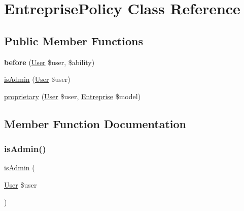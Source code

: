 \hypertarget{class_app_1_1_policies_1_1_entreprise_policy}{}\section{Entreprise\+Policy Class Reference}
\label{class_app_1_1_policies_1_1_entreprise_policy}
\subsection*{Public Member Functions}
\begin{DoxyCompactItemize}
\item 
\mbox{\label{class_app_1_1_policies_1_1_entreprise_policy_ae8e148ffcb5929131f9bbef4a09bda35}} 
{\bfseries before} (\mbox{\hyperlink{class_app_1_1_user}{User}} \$user, \$ability)
\item 
\mbox{\hyperlink{class_app_1_1_policies_1_1_entreprise_policy_aa8e6cb724a0d6225e33c3de2d7ba8606}{is\+Admin}} (\mbox{\hyperlink{class_app_1_1_user}{User}} \$user)
\item 
\mbox{\hyperlink{class_app_1_1_policies_1_1_entreprise_policy_a6bf77ee9b56dcb7367ecb24ea8452719}{proprietary}} (\mbox{\hyperlink{class_app_1_1_user}{User}} \$user, \mbox{\hyperlink{class_app_1_1_entreprise}{Entreprise}} \$model)
\end{DoxyCompactItemize}


\subsection{Member Function Documentation}
\mbox{\label{class_app_1_1_policies_1_1_entreprise_policy_aa8e6cb724a0d6225e33c3de2d7ba8606}} 
\subsubsection{\texorpdfstring{is\+Admin()}{isAdmin()}}
{\footnotesize\ttfamily is\+Admin (\begin{DoxyParamCaption}\item[{\mbox{\hyperlink{class_app_1_1_user}{User}}}]{\$user }\end{DoxyParamCaption})}

